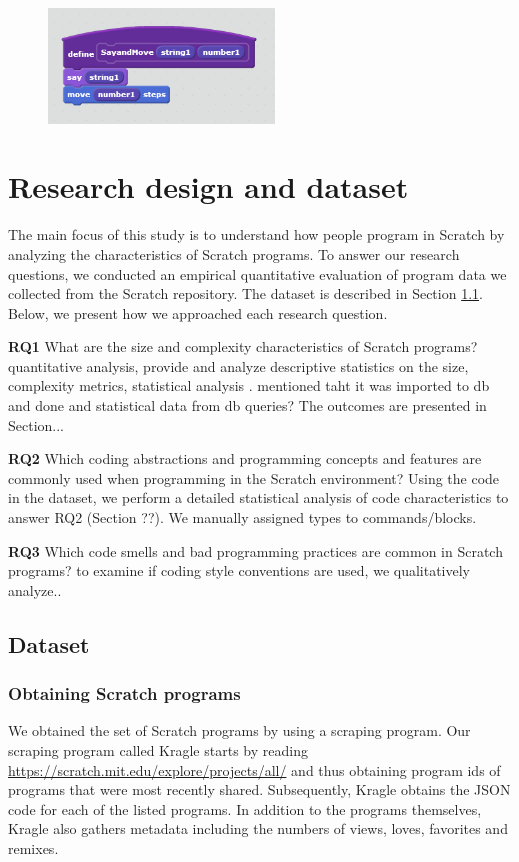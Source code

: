 \documentclass{sig-alternate}
\begin{document}
\begin{figure}
	\begin{center}
		\includegraphics[width=6cm]{fig/useBlockSmall.png}
		\caption{}
		\label{fig:useBlock}
	\end{center}
\end{figure} 


\section{Research design and dataset}
\label{researchDesign}

The main focus of this study is to understand how people program in Scratch by analyzing the characteristics of Scratch programs. To answer our research questions, we conducted an empirical quantitative evaluation of program data we collected from the Scratch repository. The dataset is described in Section \ref{dataset}. Below, we present how we approached each research question.

\textbf{RQ1} What are the size and complexity characteristics of Scratch programs? quantitative analysis, provide and analyze descriptive statistics on the size, complexity metrics, statistical analysis . mentioned taht it was imported to db and done and statistical data from db queries? The outcomes are presented in Section...

\textbf{RQ2} Which coding abstractions and programming concepts and features are commonly used when programming in the Scratch environment? Using the code in the dataset, we perform a detailed statistical analysis of code characteristics to answer RQ2 (Section ??). We manually assigned types to commands/blocks.

\textbf{RQ3} Which code smells and bad programming practices are common in Scratch programs?  to examine if coding style conventions are used, we qualitatively analyze..

\subsection{Dataset}
\label{dataset}
\subsubsection{Obtaining Scratch programs}
We obtained the set of Scratch programs by using a scraping program. Our scraping program called Kragle starts by reading \url{https://scratch.mit.edu/explore/projects/all/} and thus obtaining program ids of programs that were most recently shared. Subsequently, Kragle obtains the JSON code for each of the listed programs. In addition to the programs themselves, Kragle also gathers metadata including the numbers of views, loves, favorites and remixes.
\end{document}
